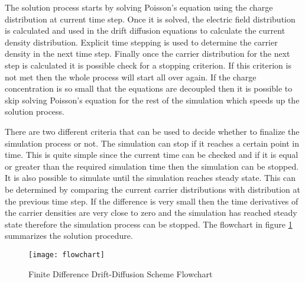 \begin{doublespace}
The solution process starts by solving Poisson's equation using the charge distribution at  current time step. Once it is solved, the electric field distribution is calculated and used in the drift diffusion equations to calculate the current density distribution. Explicit time stepping is used to determine the carrier density in the next time step. Finally once the carrier distribution for the next step is calculated it is possible check for a stopping criterion. If this criterion is not met then the whole process will start all over again. If the charge concentration is so small that the equations are decoupled then it is possible to skip solving Poisson's equation for the rest of the simulation which speeds up the solution process.

There are two different criteria that can be used to decide whether to finalize the simulation process or not. The simulation can stop if it reaches a certain point in time. This is quite simple since the current time can be checked and if it is equal or greater than the required simulation time then the simulation can be stopped. It is also possible to simulate until the simulation reaches steady state. This can be determined by comparing the current carrier distributions with distribution at the previous time step. If the difference is very small then the time derivatives of the carrier densities are very close to zero and the simulation has reached steady state therefore the simulation process can be stopped. The flowchart in figure \ref{flowchart} summarizes the solution procedure.

\clearpage

\begin{figure}
\centering
\texttt{[image: flowchart]}
\caption{Finite Difference Drift-Diffusion Scheme Flowchart} 
\label{flowchart}
\end{figure}


\end{doublespace}
